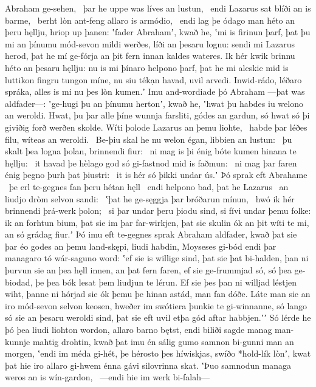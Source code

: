 Abraham ge-sehen, \hld\ þar he uppe was
líves an lustun, \hld\ endi Lazarus sat
blíði an is barme, \hld\ berht lòn ant-feng
allaro is armódio, \hld\ endi lag þe ódago man
héto an þeru hęllju, hriop up þanen:
ʽfader Abrahamʼ, kwað he, ʽmi is firinun þarf,
þat þu mi an þínumu mód-sevon mildi werðes,
líði an þesaru lognu: sendi mi Lazarus herod,
þat he mí ge-fórja an þit fern innan
kaldes wateres. Ik hér kwik brinnu
héto an þesaru hęllju: nu is mi þínaro helpono þarf,
þat he mi aleskie mid is luttikon fingru
tungon míne, nu siu tékạn havad,
uvil arvedi. Inwid-rádo,
léðaro spráka, alles is mi nu þes lòn kumen.ʼ
Imu and-wordiade þó Abraham —þat was aldfader—:
ʽge-hugi þu an þínumu hertonʼ, kwað he, ʽhwat þu habdes iu
welono an weroldi. Hwat, þu þar alle þíne wunnja farsliti,
gódes an gardun, só hwat só þi giviðig forð
werðen skolde. Wíti þolode
Lazarus an þemu liohte, \hld\ habde þar léðes filu,
wíteas an weroldi. \hld\ Be-þiu skal he nu welon égan,
libbien an lustun: \hld\ þu skalt þea logna þolan,
brinnendi fiur: \hld\ ni mag is þi énig bóte kumen
hinana te hęllju: \hld\ it havad þe hèlago god
só gi-fastnod mid is faðmun: \hld\ ni mag þar faren énig
þegno þurh þat þiustri: \hld\ it is hér só þikki undar ús.ʼ
Þó sprak eft Abrahame \hld\ þe erl te-gegnes
fan þeru hétan hęll \hld\ endi helpono bad,
þat he Lazarus \hld\ an liudjo dròm
selvon sandi: \hld\ ʽþat he ge-sęggja þar
bróðarun mínun, \hld\ hwó ik hér brinnendi
þrá-werk þolon; \hld\ si þar undar þeru þiodu sind,
si fívi undar þemu folke: ik an forhtun bium,
þat sie im þar far-wirkjen, þat sie skulin ók an þit wíti te mi,
an só grádag fiur.ʼ Þó imu eft te-gegnes sprak
Abraham aldfader, kwað þat sie þar éo godes
an þemu land-skępi, liudi habdin,
Moyseses gi-bód endi þar managaro tó
wár-saguno word: ʽef sie is willige sind,
þat sie þat bi-halden, þan ni þurvun sie an þea hęll innen,
an þat fern faren, ef sie ge-frummjad só,
só þea ge-biodad, þe þea bók lesat
þem liudjun te lérun. Ef sie þes þan ni willjad léstjen wiht,
þanne ni hórjad sie ók þemu þe hinan astád,
man fan dóðe. Láte man sie an iro mód-sevon
selvon keosen, hweðer im swótiera þunkie
te gi-winnanne, só lango só sie an þesaru weroldi sind,
þat sie eft uvil etþa gód aftar habbjen.ʼʼ
Só lérde he þó þea liudi liohton wordon,
allaro barno bętst, endi biliði sagde
manag man-kunnje mahtig drohtin,
kwað þat imu én sálig gumo samnon bi-gunni
man an morgen, ʽendi im méda gi-hét,
þe hérosto þes híwiskjas, swíðo *hold-lík lònʼ,
kwat þat hie iro allaro gi-hwem énna gávi
silovrinna skat. ʽÞuo samnodun managa
weros an is wín-gardon, \hld\ —endi hie im werk bi-falah—
